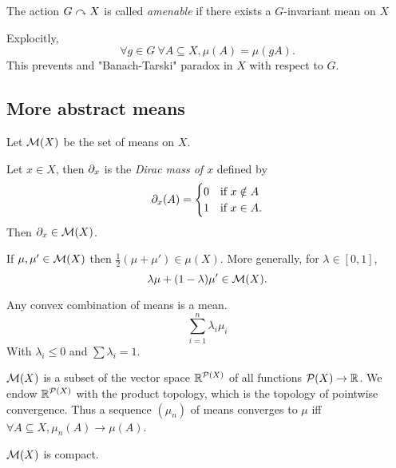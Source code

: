     \begin{definition}
        The action $G \curvearrowright X$ is called \emph{amenable}
        if there exists a $G$-invariant mean on $X$
    \end{definition}

    Explocitly, \[
        \forall g \in G~
        \forall A \subseteq X,
        \mu(A) = \mu(gA). 
    \]
    This prevents and "Banach-Tarski" paradox in $X$ with respect to $G$.

    \subsection{More abstract means}

    Let $\mathcal{M}(X)$ be the set of means on $X$.
    \begin{example}
        Let $x \in X$, then $\partial_x$ is the \emph{Dirac mass of $x$} defined by
        \[
            \partial_x(A) = \begin{cases} 
                0 & \text{if } x \notin A \\
                1 & \text{if } x \in A.
            \end{cases} 
        \]
        Then $\partial_x \in \mathcal{M}(X)$.
    \end{example}

    \begin{lemma}
        If $\mu, \mu' \in \mathcal{M}(X)$ then
        $\frac{1}{2}(\mu + \mu') \in \mu(X)$.
        More generally, for $\lambda \in [0, 1]$, 
        \[
            \lambda\mu + (1 - \lambda)\mu' \in \mathcal{M}(X).
        \]
    \end{lemma}

    \begin{corollary}
        Any convex combination of means is a mean.
        \[
            \sum_{i = 1}^n \lambda_i \mu_i
        \]
        With $\lambda_i \leq 0$ and $\sum \lambda_i = 1$.
    \end{corollary}

    \begin{remark}
        $\mathcal{M}(X)$ is a subset of the vector space $\mathbb R^{\mathcal{P}(X)}$
        of all functions $\mathcal{P}(X) \to \mathbb R$.
        We endow $\mathbb R^{\mathcal{P}(X)}$ with the product topology, 
        which is the topology of pointwise convergence.
        Thus a sequence $(\mu_n)$ of means converges to $\mu$
        iff $\forall A \subseteq X, \mu_n(A) \to \mu(A)$.
    \end{remark}

    \begin{proposition}
        $\mathcal{M}(X)$ is compact.
    \end{proposition}

